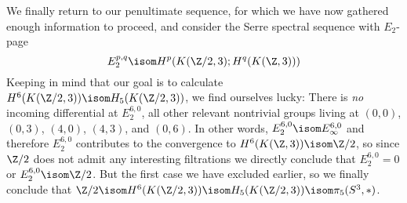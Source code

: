 \begin{solution}
	We finally return to our penultimate sequence, for which we have now gathered enough information to proceed, and consider the Serre spectral sequence with $E_2$-page
	\begin{equation*}
		E_2^{p, q} \isom H^p(K(\Zn{2}, 3); H^q(K(\Z, 3)))
	\end{equation*}
	Keeping in mind that our goal is to calculate $H^6(K(\Zn{2}, 3)) \isom H_5(K(\Zn{2}, 3))$, we find ourselves lucky:
	There is \emph{no} incoming differential at $E_2^{6, 0}$, all other relevant nontrivial groups living at $(0, 0)$, $(0, 3)$, $(4, 0)$, $(4, 3)$, and $(0, 6)$.
	In other words, $E_2^{6, 0} \isom E_\infty^{6, 0}$ and therefore $E_2^{6, 0}$ contributes to the convergence to $H^6(K(\Z, 3)) \isom \Zn{2}$, so since $\Zn{2}$ does not admit any interesting filtrations we directly conclude that $E_2^{6, 0} = 0$ or $E_2^{6, 0} \isom \Zn{2}$.
	But the first case we have excluded earlier, so we finally conclude that $\Zn{2} \isom H^6(K(\Zn{2}, 3)) \isom H_5(K(\Zn{2}, 3)) \isom \pi_5(S^3, *)$.
\end{solution}
